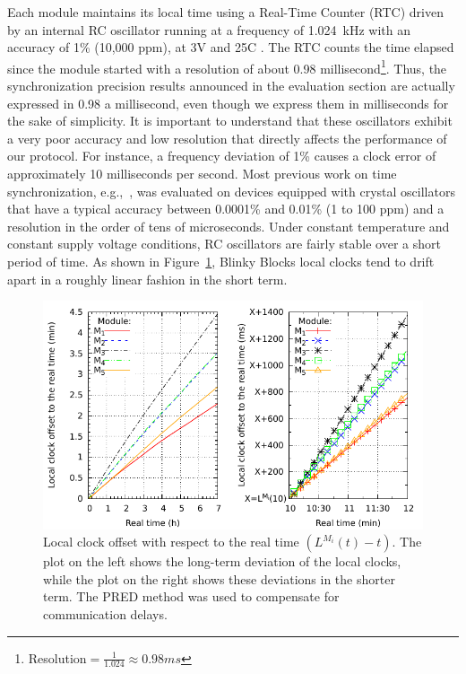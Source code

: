 Each module maintains its local time using a Real-Time Counter (RTC) driven by an internal RC oscillator running at a frequency of 1.024~kHz with an accuracy of 1\% (10,000 ppm), at 3V and 25\degree C \cite{avr1003}. The RTC counts the time elapsed since the module started with a resolution of about 0.98 millisecond\footnote{Resolution$ = \frac{1}{1.024} \approx 0.98 ms$}. Thus, the synchronization precision results announced in the evaluation section are actually expressed in 0.98 a millisecond, even though we express them in milliseconds for the sake of simplicity. It is important to understand that these oscillators exhibit a very poor accuracy and low resolution that directly affects the performance of our protocol. For instance, a frequency deviation of 1\% causes a clock error of approximately 10 milliseconds per second. Most previous work on time synchronization, e.g.,~\cite{elson2002fine,ganeriwal2003timing,maroti2004flooding,schenato2011average}, was evaluated on devices equipped with crystal oscillators that have a typical accuracy between 0.0001\% and 0.01\% (1 to 100 ppm) and a resolution in the order of tens of microseconds. Under constant temperature and constant supply voltage conditions, RC oscillators are fairly stable over a short period of time. As shown in Figure~\ref{fig:time-sync:deviation-real-time}, Blinky Blocks local clocks tend to drift apart in a roughly linear fashion in the short term.

\begin{figure}[h!]
	\centering
	\includegraphics[width=0.7\linewidth]{images/time-synchronization/deviation-real-time}
	\caption{Local clock offset with respect to the real time $(L^{M_i}(t) - t)$. The plot on the left shows the long-term deviation of the local clocks, while the plot on the right shows these deviations in the shorter term. The PRED method was used to compensate for communication delays.}
	\label{fig:time-sync:deviation-real-time}
\end{figure}

